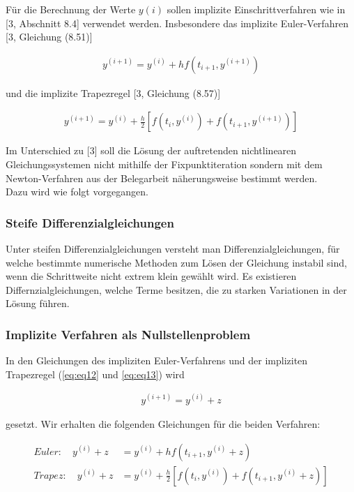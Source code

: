 \documentclass[
	pagesize,
	fontsize=12pt,
	paper=a4,
	oneside,
   reqno
]{scrartcl}
\begin{document}
Für die Berechnung der Werte $y(i)$ sollen implizite Einschrittverfahren wie in [3, Abschnitt 8.4] verwendet werden. Insbesondere das implizite Euler-Verfahren [3, Gleichung (8.51)]

\begin{align}
   \label{eq:eq12}
   y^{(i+1)} = y^{(i)} + hf(t_{i+1},y^{(i+1)})
\end{align}

und die implizite Trapezregel [3, Gleichung (8.57)]

\begin{align}
   \label{eq:eq13}
   y^{(i+1)} = y^{(i)} + \frac{h}{2}\left[ f(t_{i},y^{(i)}) + f(t_{i+1},y^{(i+1)}) \right]
\end{align}

Im Unterschied zu [3] soll die Lösung der auftretenden nichtlinearen Gleichungssystemen nicht mithilfe der Fixpunktiteration sondern mit dem Newton-Verfahren aus der Belegarbeit näherungsweise bestimmt werden. \\

Dazu wird wie folgt vorgegangen.

\subsubsection{Steife Differenzialgleichungen}

Unter steifen Differenzialgleichungen versteht man Differenzialgleichungen, für welche bestimmte numerische Methoden zum Lösen der Gleichung instabil sind, wenn die Schrittweite nicht extrem klein gewählt wird. Es existieren Differnzialgleichungen, welche Terme besitzen, die zu starken Variationen in der Lösung führen.

\subsubsection{Implizite Verfahren als Nullstellenproblem}

In den Gleichungen des impliziten Euler-Verfahrens und der impliziten Trapezregel (\autoref{eq:eq12} und \autoref{eq:eq13}) wird

\begin{align*}
   y^{(i+1)} = y^{(i)} + z
\end{align*}

gesetzt. Wir erhalten die folgenden Gleichungen für die beiden Verfahren:

\begin{align*}
   Euler: \quad y^{(i)} + z &= y^{(i)} + hf(t_{i+1},y^{(i)} + z) \\
   Trapez: \quad y^{(i)} + z &= y^{(i)} + \frac{h}{2}\left[ f(t_{i},y^{(i)}) + f(t_{i+1},y^{(i)} + z) \right] \\
\end{align*}
\end{document}
